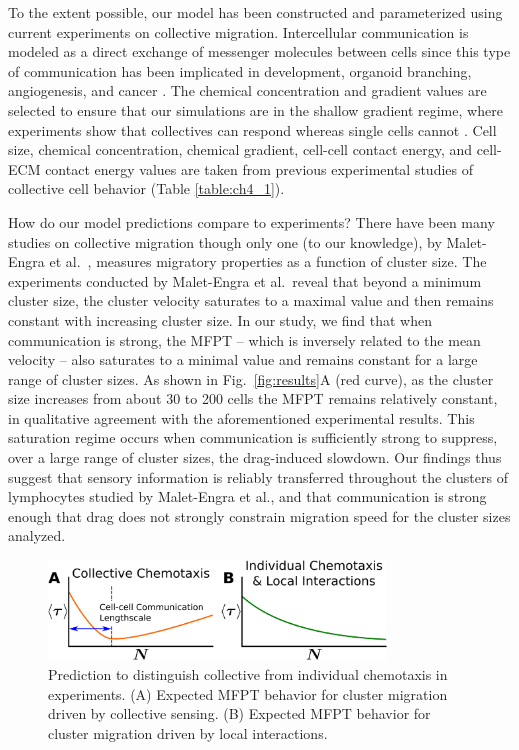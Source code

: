 To the extent possible, our model has been constructed and parameterized using current experiments on collective migration. Intercellular communication is modeled as a direct exchange of messenger molecules between cells since this type of  communication has been implicated in development, organoid branching, angiogenesis, and cancer \cite{ramel2013rab11,ellison2016cell,gerhardt2003vegf,hsu2000cadherin,friedl2009collective}. The chemical concentration and gradient values are selected to ensure that our simulations are in the shallow gradient regime, where experiments show that collectives can respond whereas single cells cannot \cite{ellison2016cell,malet2015collective,rosoff2004new}. Cell size, chemical concentration, chemical gradient, cell-cell contact energy, and cell-ECM contact energy values are taken from previous experimental studies of collective cell behavior (Table \ref{table:ch4_1}).

How do our model predictions compare to experiments? There have been many studies on collective migration \cite{cheung2013collective,puliafito2015three,defranco2008migrating,ramel2013rab11} though only one (to our knowledge), by Malet-Engra et al.\ \cite{malet2015collective}, measures migratory properties as a function of cluster size. The experiments conducted by Malet-Engra et al.\ reveal that beyond a minimum cluster size, the cluster velocity saturates to a maximal value and then remains constant with increasing cluster size. In our study, we find that when communication is strong, the MFPT -- which is inversely related to the mean velocity -- also saturates to a minimal value and remains constant for a large range of cluster sizes. As shown in Fig.\ \ref{fig:results}A (red curve), as the cluster size increases from about 30 to 200 cells the MFPT remains relatively constant, in qualitative agreement with the aforementioned experimental results. This saturation regime occurs when communication is sufficiently strong to suppress, over a large range of cluster sizes, the drag-induced slowdown. Our findings thus suggest that sensory information is reliably transferred throughout the clusters of lymphocytes studied by Malet-Engra et al., and that communication is strong enough that drag does not strongly constrain migration speed for the cluster sizes analyzed.


\begin{figure}[ht]
    \centering
        \includegraphics[width=0.80\textwidth]{../fig/ch4_fig4.png}
    \caption{Prediction to distinguish collective from individual chemotaxis in experiments. (A) Expected MFPT behavior for cluster migration driven by collective sensing. (B) Expected MFPT behavior for cluster migration driven by local interactions.} \label{fig:mfpt}
\end{figure}


